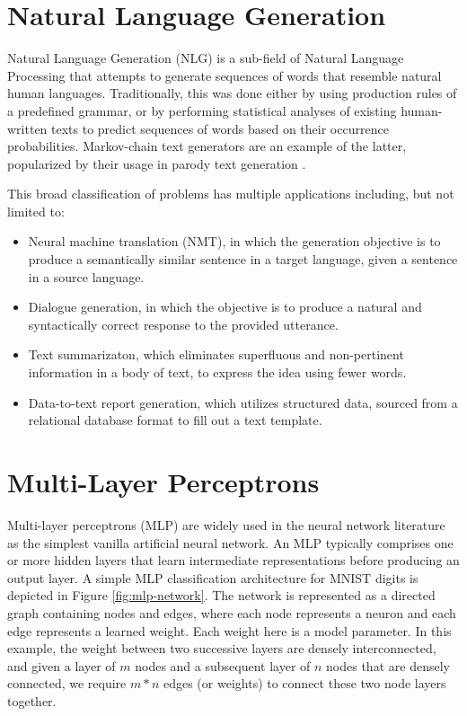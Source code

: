 \section{Natural Language Generation}

Natural Language Generation (NLG) is a sub-field of Natural Language Processing that attempts to generate sequences of words that resemble natural human languages. Traditionally, this was done either by using production rules of a predefined grammar, or by performing statistical analyses of existing human-written texts to predict sequences of words based on their occurrence probabilities. Markov-chain text generators are an example of the latter, popularized by their usage in parody text generation \cite{jelinek1985markov}.

This broad classification of problems has multiple applications including, but not limited to:
\begin{itemize}
	\item Neural machine translation (NMT), in which the generation objective is to produce a semantically similar sentence in a target language, given a sentence in a source language.
	\item Dialogue generation, in which the objective is to produce a natural and syntactically correct response to the provided utterance.
	\item Text summarizaton, which eliminates superfluous and non-pertinent information in a body of text, to express the idea using fewer words.
	\item Data-to-text report generation, which utilizes structured data, sourced from a relational database format to fill out a text template.
\end{itemize}


\section{Multi-Layer Perceptrons}

Multi-layer perceptrons (MLP) are widely used in the neural network literature as the simplest vanilla artificial neural network. An MLP typically comprises one or more hidden layers that learn intermediate representations before producing an output layer. A simple MLP classification architecture for MNIST digits \citep{lecun2010mnist} \citep{deng2012mnist} is depicted in Figure \ref{fig:mlp-network}. The network is represented as a directed graph containing nodes and edges, where each node represents a neuron and each edge represents a learned weight. Each weight here is a model parameter. In this example, the weight between two successive layers are densely interconnected, and given a layer of $m$ nodes and a subsequent layer of $n$ nodes that are densely connected, we require $m*n$ edges (or weights) to connect these two node layers together.


